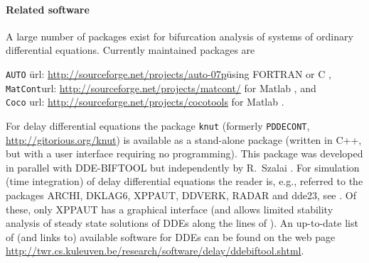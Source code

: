 \documentclass[10pt]{scrartcl}
\newcommand{\DDEBIFCODE}{\textsc{DDE-BIFTOOL}}
\newcommand{\ddebifweb}{\url{http://twr.cs.kuleuven.be/research/software/delay/ddebiftool.shtml}}
\begin{document}
\paragraph{Related software}
A large number of packages exist for bifurcation analysis of systems
of ordinary differential equations. Currently maintained packages are
\begin{tabbing}
  \texttt{AUTO}\qquad
  \= url: \url{http://sourceforge.net/projects/auto-07p}\qquad\=
  using FORTRAN or C \cite{Doed99,Doed07},\\
  \texttt{MatCont}\>url: \url{http://sourceforge.net/projects/matcont/}\>
  for Matlab \cite{DGK03,G00}, and\\
  \texttt{Coco}\> url: \url{http://sourceforge.net/projects/cocotools}\> for
  Matlab \cite{DS13}.
\end{tabbing}
For delay differential equations the package \texttt{knut} (formerly
\texttt{PDDECONT}, \url{http://gitorious.org/knut}) is available as a
stand-alone package (written in C++, but with a user interface
requiring no programming). This package was developed in parallel with
\DDEBIFCODE{} but independently by R.~Szalai \cite{SSH06,RS07}.  For
simulation (time integration) of delay differential equations the
reader is, e.g., referred to the packages ARCHI, DKLAG6, XPPAUT,
DDVERK, RADAR and dde23, see
\cite{Paul95,Thom97,Erme98,Enri97,Sham00,Gugl07}.  Of these, only
XPPAUT has a graphical interface (and allows limited stability
analysis of steady state solutions of DDEs along the lines of
\cite{Luzy96}). An up-to-date list of (and links to) available
software for DDEs can be found on the web page \ddebifweb{}.
\end{document}
